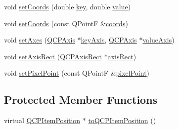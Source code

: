 \begin{DoxyCompactItemize}
\item 
void \hyperlink{class_q_c_p_item_position_aa988ba4e87ab684c9021017dcaba945f}{set\+Coords} (double \hyperlink{class_q_c_p_item_position_ac3cb2bddf5f89e5181830be30b93d090}{key}, double \hyperlink{class_q_c_p_item_position_a6817f7356d3a2b63e8446c6b6106dae1}{value})
\item 
void \hyperlink{class_q_c_p_item_position_acc70b3abc143287f806e5f154e5e07b0}{set\+Coords} (const Q\+Point\+F \&\hyperlink{class_q_c_p_item_position_a253d7adbb6d46299bd6cbc31aa8819f1}{coords})
\item 
void \hyperlink{class_q_c_p_item_position_a2185f45c75ac8cb9be89daeaaad50e37}{set\+Axes} (\hyperlink{class_q_c_p_axis}{Q\+C\+P\+Axis} $\ast$\hyperlink{class_q_c_p_item_position_ab99de7ae5766d246defb2de9f47eaf51}{key\+Axis}, \hyperlink{class_q_c_p_axis}{Q\+C\+P\+Axis} $\ast$\hyperlink{class_q_c_p_item_position_a8d3a039fb2e69df86b4015daa30dfd2d}{value\+Axis})
\item 
void \hyperlink{class_q_c_p_item_position_a0cd9b326fb324710169e92e8ca0041c2}{set\+Axis\+Rect} (\hyperlink{class_q_c_p_axis_rect}{Q\+C\+P\+Axis\+Rect} $\ast$\hyperlink{class_q_c_p_item_position_a7f10fa702a324880cc4de958f434cec7}{axis\+Rect})
\item 
void \hyperlink{class_q_c_p_item_position_ab404e56d9ac2ac2df0382c57933a71ef}{set\+Pixel\+Point} (const Q\+Point\+F \&\hyperlink{class_q_c_p_item_position_ae490f9c76ee2ba33752c495d3b6e8fb5}{pixel\+Point})
\end{DoxyCompactItemize}
\subsection*{Protected Member Functions}
\begin{DoxyCompactItemize}
\item 
virtual \hyperlink{class_q_c_p_item_position}{Q\+C\+P\+Item\+Position} $\ast$ \hyperlink{class_q_c_p_item_position_a577a7efc601df85a20b3e709d1ac320e}{to\+Q\+C\+P\+Item\+Position} ()
\end{DoxyCompactItemize}
